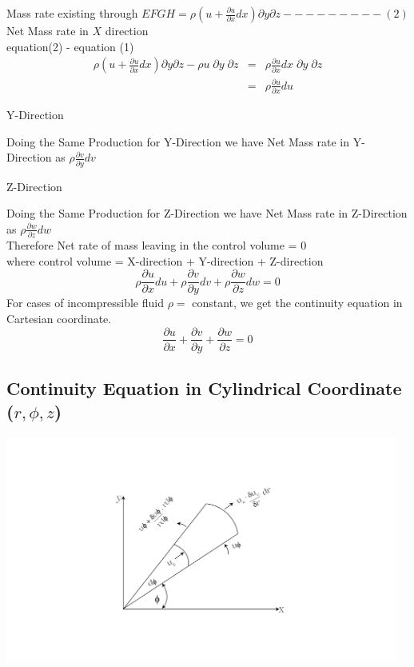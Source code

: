 \documentclass[a4paper, 12pt]{report}
\begin{document}
\noindent Mass rate existing through $\displaystyle EFGH = \rho(u + \frac{\partial u}{\partial x}dx)\partial y \partial z ---------(2)$\\

\noindent Net Mass rate in $X$ direction\\
equation(2) - equation (1)\\
\begin{eqnarray*}
	\rho(u + \frac{\partial u}{\partial x}dx) \partial y \partial z - \rho u \; \partial y \; \partial z &=&  \rho \frac{\partial u}{\partial x}dx \; \partial y \; \partial z\\[0.3cm]
	&=& \rho \frac{\partial u}{\partial x}du
\end{eqnarray*}

\begin{center}
	Y-Direction
\end{center}
Doing the Same Production for Y-Direction we have Net Mass rate in Y-Direction as $\displaystyle \rho \frac{\partial v}{\partial y}dv$\\
\begin{center}
	Z-Direction
\end{center}
Doing the Same Production for Z-Direction we have Net Mass rate in Z-Direction as $\displaystyle \rho \frac{\partial w}{\partial z}dw$\\

Therefore Net rate of mass leaving in the control volume = 0\\
where control volume = X-direction + Y-direction + Z-direction\\
$$
\rho \frac{\partial u}{\partial x}du + \rho \frac{\partial v}{\partial y}dv + \rho \frac{\partial w}{\partial z}dw = 0
$$
For cases of incompressible fluid $\rho = $ constant, we get the continuity equation in Cartesian coordinate.
$$
\frac{\partial u}{\partial x} + \frac{\partial v}{\partial y} + \frac{\partial w}{\partial z} = 0
$$

\subsection{Continuity Equation in Cylindrical Coordinate ($r, \phi, z$)}

\begin{center}
	\includegraphics[width=0.97\textwidth]{bobo}
\end{center}
\end{document}
